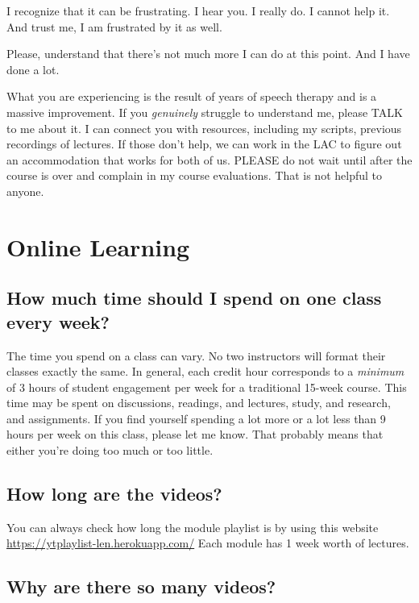 \documentclass[
]{book}
\begin{document}
I recognize that it can be frustrating. I hear you. I really do. I cannot help it. And trust me, I am frustrated by it as well.

Please, understand that there's not much more I can do at this point. And I have done a lot.

What you are experiencing is the result of years of speech therapy and is a massive improvement. If you \emph{genuinely} struggle to understand me, please TALK to me about it. I can connect you with resources, including my scripts, previous recordings of lectures. If those don't help, we can work in the LAC to figure out an accommodation that works for both of us. PLEASE do not wait until after the course is over and complain in my course evaluations. That is not helpful to anyone.

\hypertarget{online-learning}{%
\section{Online Learning}\label{online-learning}}

\hypertarget{how-much-time-should-i-spend-on-one-class-every-week}{%
\subsection{How much time should I spend on one class every week?}\label{how-much-time-should-i-spend-on-one-class-every-week}}

The time you spend on a class can vary. No two instructors will format their classes exactly the same. In general, each credit hour corresponds to a \emph{minimum} of 3 hours of student engagement per week for a traditional 15-week course. This time may be spent on discussions, readings, and lectures, study, and research, and assignments.
If you find yourself spending a lot more or a lot less than 9 hours per week on this class, please let me know. That probably means that either you're doing too much or too little.

\hypertarget{how-long-are-the-videos}{%
\subsection{How long are the videos?}\label{how-long-are-the-videos}}

You can always check how long the module playlist is by using this website \url{https://ytplaylist-len.herokuapp.com/}
Each module has 1 week worth of lectures.

\hypertarget{why-are-there-so-many-videos}{%
\subsection{Why are there so many videos?}\label{why-are-there-so-many-videos}}
\end{document}
